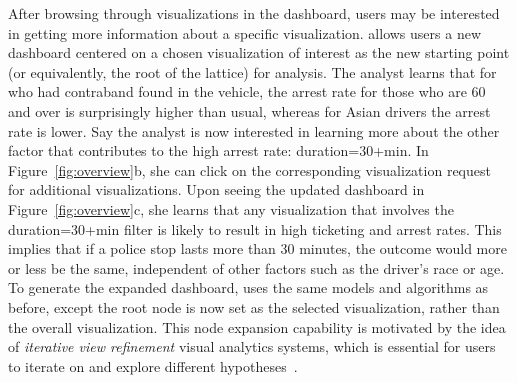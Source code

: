 \par After browsing through visualizations in the dashboard, users may be interested in getting more information about a specific visualization. \system allows users  a new dashboard centered on a chosen visualization of interest as the new starting point (or equivalently, the root of the lattice) for analysis. The analyst learns that for  who had contraband found in the vehicle, the arrest rate for those who are 60 and over is surprisingly higher than usual, whereas for Asian drivers the arrest rate is lower. Say the analyst is now interested in learning more about the other factor that contributes to the high arrest rate: duration=30+min. In Figure~\ref{fig:overview}b, she can click on the corresponding visualization  request for additional visualizations. Upon seeing the updated dashboard in Figure~\ref{fig:overview}c, she learns that any visualization that involves the duration=30+min filter is likely to result in high ticketing and arrest rates. This implies that if a police stop lasts more than 30 minutes, the outcome would more or less be the same, independent of other factors such as the driver's race or age. To generate the expanded dashboard, \system uses the same models and algorithms as before, except the root node is now set as the selected visualization, rather than the overall visualization. This node expansion capability is motivated by the idea of \textit{iterative view refinement}  visual analytics systems, which is essential for users to iterate on and explore different hypotheses~\cite{Hoque2017,Wongsuphasawat2016}.
